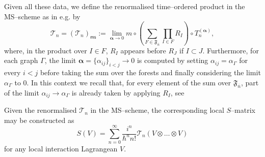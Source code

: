 \documentclass[10pt]{book}
\newcommand{\ms}{\mathsf{ms}}
\theoremstyle{break}
\begin{document}
Given all these data, we define the renormalised time--ordered product in the MS--scheme as in e.g. %
by
\begin{equation*}
\mathcal{T}_n = \left(\mathcal{T}_n\right)_\ms := \lim_{\boldsymbol{\alpha} \to 0}   m \circ   \left( \sum_{F\in\mathfrak{F}_{\overline{n}}} \prod_{I\in F} R_I\right)  \circ    T^{(\boldsymbol{\alpha})}_n,
\end{equation*}
where, in the product over $I\in F$, $R_I$ appears before $R_J$ if $I\subset J$. 
Furthermore, for each graph $\Gamma$, the limit $\boldsymbol{\alpha}=\{\alpha_{ij}\}_{i<j}\to 0$ is computed by setting $\alpha_{ij}= \alpha_\Gamma$ for every $i<j$ before taking the sum over the forests and finally considering the limit $\alpha_\Gamma$ to $0$. In this context we recall that, for every element of the sum over $\mathfrak{F}_{\overline{n}}$, part of the limit $\alpha_{ij}\to \alpha_\Gamma$ is already taken by applying $R_I$, see %

Given the renormalised $\mathcal{T}_n$ in the MS--scheme, the corresponding local $S$--matrix may be constructed as 
\[
S(V) = \sum^\infty_{n=0}\frac{i^n}{\hbar^n n!}\mathcal{T}_n(V\otimes  \dots \otimes V)
\]
for any local interaction Lagrangean $V$.
\end{document}
